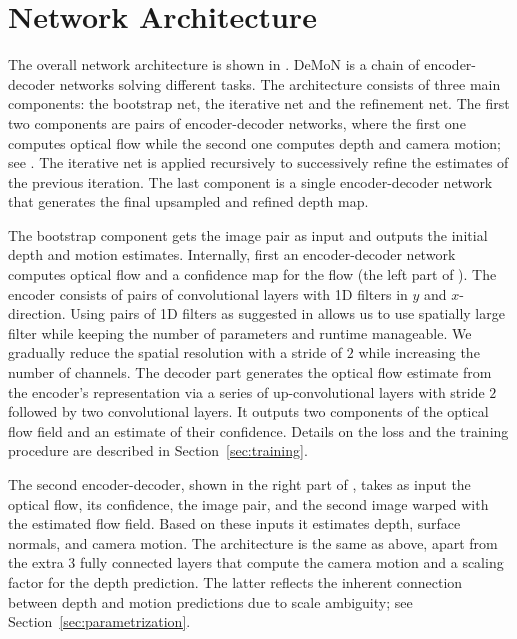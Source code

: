 \documentclass[10pt,twocolumn,letterpaper]{article}
\begin{document}
\section{Network Architecture}

The overall network architecture is shown in .
\mbox{DeMoN} is a chain of encoder-decoder networks solving different tasks. 
The architecture consists of three main components: the bootstrap net, the iterative net and the refinement net. 
The first two components are pairs of encoder-decoder networks, where the first one computes optical flow while the second one computes depth and camera motion; see . The iterative net is applied 
recursively to successively refine the estimates of the previous iteration. 
The last component is a single encoder-decoder network that generates the final upsampled and refined depth map.%

The bootstrap component gets the image pair as input and outputs the initial depth and motion estimates. 
Internally, first an encoder-decoder network computes optical flow and a confidence map for the flow (the left part of ). 
The encoder consists of pairs of convolutional layers with 1D filters in $y$ and $x$-direction.
Using pairs of 1D filters as suggested in \cite{szegedy_rethinking_2015} allows us to use spatially large filter while keeping the number of parameters and runtime manageable.
We gradually reduce the spatial resolution with a stride of $2$ while increasing the number of channels.
The decoder part generates the optical flow estimate from the encoder's representation via a series of up-convolutional layers with stride $2$ followed by two convolutional layers.
It outputs two components of the optical flow field and an estimate of their confidence.
Details on the loss and the training procedure are described in Section~\ref{sec:training}.

The second encoder-decoder, shown in the right part of , takes as input the optical flow, its confidence, the image pair, and the 
second image warped with the estimated flow field.
Based on these inputs it estimates depth, surface normals, and camera motion.
The architecture is the same as above, apart from the extra 3 fully connected layers that compute the camera motion and a scaling factor for the depth prediction.
The latter reflects the inherent connection between depth and motion predictions due to scale ambiguity; see Section~\ref{sec:parametrization}. 
\end{document}
